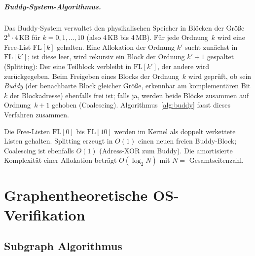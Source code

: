 ﻿\documentclass[a4paper,12pt]{scrreprt}
\theoremstyle{definition}
\begin{document}
	\paragraph{Buddy-System-Algorithmus.}
	Das Buddy-System verwaltet den physikalischen Speicher in Blöcken der
	Größe $2^k \cdot 4\,\text{KB}$ für $k = 0, 1, \ldots, 10$ (also 4\,KB
	bis 4\,MB). Für jede Ordnung~$k$ wird eine Free-List $\mathrm{FL}[k]$
	gehalten. Eine Allokation der Ordnung $k'$ sucht zunächst in
	$\mathrm{FL}[k']$; ist diese leer, wird rekursiv ein Block der Ordnung
	$k'+1$ gespaltet (Splitting): Der eine Teilblock verbleibt in
	$\mathrm{FL}[k']$, der andere wird zurückgegeben. Beim Freigeben eines
	Blocks der Ordnung~$k$ wird geprüft, ob sein \emph{Buddy} (der benachbarte
	Block gleicher Größe, erkennbar am komplementären Bit\,$k$ der
	Blockadresse) ebenfalls frei ist; falls ja, werden beide Blöcke zusammen
	auf Ordnung~$k+1$ gehoben (Coalescing). Algorithmus~\ref{alg:buddy}
	fasst dieses Verfahren zusammen.

	\begin{algorithm}[H]
		\caption{EDF$^+$-bewusster Buddy-Allokator}
		\label{alg:buddy}
		\begin{algorithmic}[1]
			\State \Return {}
			\Else
			\State {} 
			\State \Return {}
			\EndIf
			\EndProcedure
		\end{algorithmic}
	\end{algorithm}

	Die Free-Listen $\mathrm{FL}[0]$ bis $\mathrm{FL}[10]$ werden im Kernel
	als doppelt verkettete Listen gehalten. Splitting erzeugt in $O(1)$
	einen neuen freien Buddy-Block; Coalescing ist ebenfalls $O(1)$
	(Adress-XOR zum Buddy). Die amortisierte Komplexität einer Allokation
	beträgt $O(\log_2 N)$ mit $N = $ Gesamtseitenzahl.
	
	\chapter{Graphentheoretische OS-Verifikation}
	
	\section{Subgraph Algorithmus}
\end{document}
